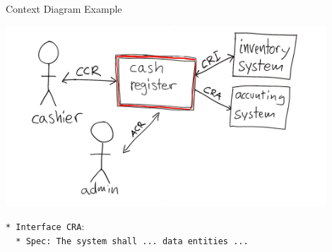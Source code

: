 \begin{Slide}{Context Diagram Example}
\begin{minipage}[t]{1.0\textwidth}
\vspace{-1em}\includegraphics[width=0.9\textwidth]{../img/context-diagram-example}
\end{minipage}%
\vspace{1em}
\texttt{*~Interface~CRA}:\\ 
  \texttt{~~*~Spec:~The system shall ...~data entities ...}

\end{Slide}
